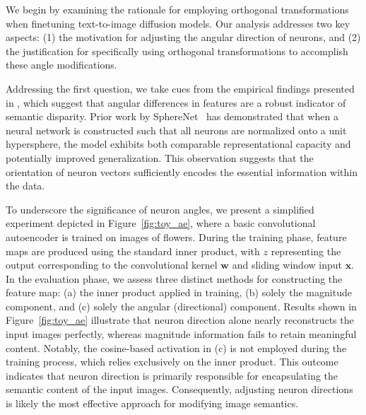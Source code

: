 We begin by examining the rationale for employing orthogonal transformations when finetuning text-to-image diffusion models. Our analysis addresses two key aspects: (1) the motivation for adjusting the angular direction of neurons, and (2) the justification for specifically using orthogonal transformations to accomplish these angle modifications.

Addressing the first question, we take cues from the empirical findings presented in \cite{liu2018decoupled,chen2020angular}, which suggest that angular differences in features are a robust indicator of semantic disparity. Prior work by SphereNet~\cite{liu2017deep} has demonstrated that when a neural network is constructed such that all neurons are normalized onto a unit hypersphere, the model exhibits both comparable representational capacity and potentially improved generalization. This observation suggests that the orientation of neuron vectors sufficiently encodes the essential information within the data. 

To underscore the significance of neuron angles, we present a simplified experiment depicted in Figure~\ref{fig:toy_ae}, where a basic convolutional autoencoder is trained on images of flowers. During the training phase, feature maps are produced using the standard inner product, with $z$ representing the output corresponding to the convolutional kernel $\bm{w}$ and sliding window input $\bm{x}$. In the evaluation phase, we assess three distinct methods for constructing the feature map: (a) the inner product applied in training, (b) solely the magnitude component, and (c) solely the angular (directional) component. Results shown in Figure~\ref{fig:toy_ae} illustrate that neuron direction alone nearly reconstructs the input images perfectly, whereas magnitude information fails to retain meaningful content. Notably, the cosine-based activation in (c) is not employed during the training process, which relies exclusively on the inner product. This outcome indicates that neuron direction is primarily responsible for encapsulating the semantic content of the input images. Consequently, adjusting neuron directions is likely the most effective approach for modifying image semantics.

